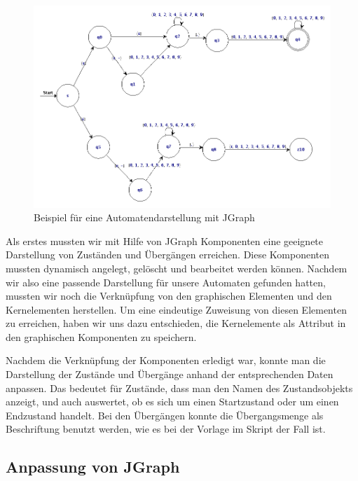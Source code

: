 \begin{figure}[h!]
\begin{center}
\includegraphics[width=12cm]{../images/enfa_example.png}
\caption{Beispiel für eine Automatendarstellung mit JGraph}
\end{center}
\end{figure}
\vspace{10pt}

Als erstes mussten wir mit Hilfe von JGraph Komponenten eine geeignete
Darstellung von Zuständen und Übergängen erreichen. Diese Komponenten mussten dynamisch
angelegt, gelöscht und bearbeitet werden können. Nachdem wir also eine passende
Darstellung für unsere Automaten gefunden hatten, mussten wir noch die
Verknüpfung von den graphischen Elementen und den Kernelementen herstellen. Um
eine eindeutige Zuweisung von diesen Elementen zu erreichen, haben wir uns dazu
entschieden, die Kernelemente als Attribut in den graphischen Komponenten zu
speichern.\vspace{10pt}

Nachdem die Verknüpfung der Komponenten erledigt war, konnte man die Darstellung
der Zustände und Übergänge anhand der entsprechenden Daten anpassen. Das bedeutet
für Zustände, dass man den Namen des Zustandsobjekts anzeigt, und auch auswertet,
ob es sich um einen Startzustand oder um einen Endzustand handelt. Bei den
Übergängen konnte die Übergangsmenge als Beschriftung benutzt werden, wie es bei
der Vorlage im Skript der Fall ist.\vspace{10pt}


\subsection{Anpassung von JGraph}\label{GraphJGraphAdaptation}

